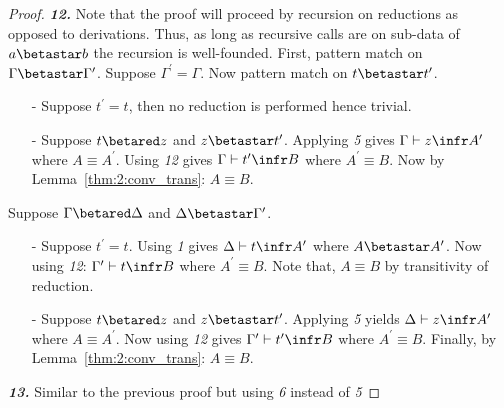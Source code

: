 \begin{proof}
    \noindent \textbf{\textit{12.}}
    Note that the proof will proceed by recursion on reductions as opposed to derivations.
    Thus, as long as recursive calls are on sub-data of $a \betastar b$ the recursion is well-founded.
    First, pattern match on $\Gamma \betastar \Gamma^\prime$.
    Suppose $\Gamma^\prime = \Gamma$.
    Now pattern match on $t \betastar t^\prime$.
    \begin{enumerate}
        \item[-] {
            Suppose $t^\prime = t$, then no reduction is performed hence trivial.
        }
        \item[-] {
            Suppose $t \betared z$ and $z \betastar t^\prime$.
            Applying \textit{5} gives $\Gamma \vdash z \infr A^\prime$ where $A \equiv A^\prime$.
            Using \textit{12} gives $\Gamma \vdash t^\prime \infr B$ where $A^\prime \equiv B$.
            Now by Lemma~\ref{thm:2:conv_trans}: $A \equiv B$.
        }
    \end{enumerate}
    Suppose $\Gamma \betared \Delta$ and $\Delta \betastar \Gamma^\prime$.
    \begin{enumerate}
        \item[-] {
            Suppose $t^\prime = t$.
            Using \textit{1} gives $\Delta \vdash t \infr A^\prime$ where $A \betastar A^\prime$.
            Now using \textit{12}: $\Gamma^\prime \vdash t \infr B$ where $A^\prime \equiv B$.
            Note that, $A \equiv B$ by transitivity of reduction.
        }
        \item[-] {
            Suppose $t \betared z$ and $z \betastar t^\prime$.
            Applying \textit{5} yields $\Delta \vdash z \infr A^\prime$ where $A \equiv A^\prime$.
            Now using \textit{12} gives $\Gamma^\prime \vdash t^\prime \infr B$ where $A^\prime \equiv B$.
            Finally, by Lemma~\ref{thm:2:conv_trans}: $A \equiv B$.
        }
    \end{enumerate}

    \noindent \textbf{\textit{13.}} Similar to the previous proof but using \textit{6} instead of \textit{5}


\end{proof}
